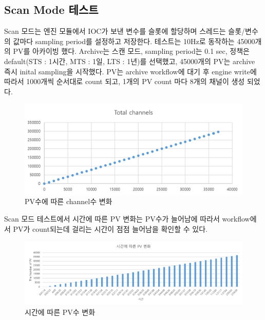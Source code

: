 \documentclass[11pt
  , a4paper
  , article
  , oneside
]{memoir}
\begin{document}
	\subsection{Scan Mode 테스트}
	Scan 모드는 엔진 모듈에서 IOC가 보낸 변수를 슬롯에 할당하며 스레드는 슬롯/변수의 값마다 sampling period를 설정하고 저장한다. 테스트는 10Hz로 동작하는 45000개의 PV를 아카이빙 했다. Archive는 스캔 모드, sampling period는 0.1 sec, 정책은 default(STS : 1시간, MTS : 1일, LTS : 1년)를 선택했고, 45000개의 PV는 archive 즉시 inital sampling을 시작했다. PV는 archive workflow에 대기 후 engine write에 따라서 1000개씩 순서대로 count 되고, 1개의 PV count 마다 8개의 채널이 생성 되었다.  
	\begin{figure}[h!]
			\centering
			\includegraphics[width=1\textwidth, height=0.25\textheight]{./images/channel.png}
			\caption{PV수에 따른 channel수 변화}
	\end{figure}
		
	Scan 모드 테스트에서 시간에 따른 PV 변화는 PV수가 늘어남에 따라서 workflow에서 PV가 count되는데 걸리는 시간이 점점 늘어남을 확인할 수 있다.
	\begin{figure}[h!]
		\centering
		\includegraphics[width=1\textwidth, height=0.25\textheight]{./images/time.png}
		\caption{시간에 따른 PV수 변화}
	\end{figure}
	
\end{document}
